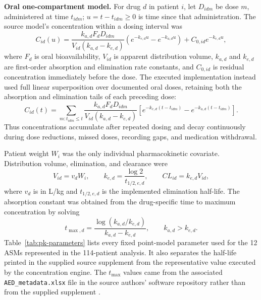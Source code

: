 \documentclass[11pt]{article}
\begin{document}
\textbf{Oral one-compartment model.} For drug $d$ in patient $i$, let $D_{idm}$ be dose $m$, administered at time $t_{idm}$; $u=t-t_{idm}\geq0$ is time since that administration. The source model's concentration within a dosing interval was
\begin{equation}
C_{id}(u)=
\frac{k_{a,d}F_dD_{idm}}{V_{id}(k_{a,d}-k_{e,d})}
\left(e^{-k_{e,d}u}-e^{-k_{a,d}u}\right)
+C_{0,id}e^{-k_{e,d}u},
\label{eq:pk-interval}
\end{equation}
where $F_d$ is oral bioavailability, $V_{id}$ is apparent distribution volume, $k_{a,d}$ and $k_{e,d}$ are first-order absorption and elimination rate constants, and $C_{0,id}$ is residual concentration immediately before the dose. The executed implementation instead used full linear superposition over documented oral doses, retaining both the absorption and elimination tails of each preceding dose:
\begin{equation}
C_{id}(t)=\sum_{m:t_{idm}\leq t}
\frac{k_{a,d}F_dD_{idm}}{V_{id}(k_{a,d}-k_{e,d})}
\left[e^{-k_{e,d}(t-t_{idm})}-e^{-k_{a,d}(t-t_{idm})}\right].
\label{eq:pk-superposition}
\end{equation}
Thus concentrations accumulate after repeated dosing and decay continuously during dose reductions, missed doses, recording gaps, and medication withdrawal.

Patient weight $W_i$ was the only individual pharmacokinetic covariate. Distribution volume, elimination, and clearance were
\begin{equation}
V_{id}=v_dW_i,\qquad
k_{e,d}=\frac{\log 2}{t_{1/2,e,d}},\qquad
CL_{id}=k_{e,d}V_{id},
\label{eq:pk-rates}
\end{equation}
where $v_d$ is in L/kg and $t_{1/2,e,d}$ is the implemented elimination half-life. The absorption constant was obtained from the drug-specific time to maximum concentration by solving
\begin{equation}
t_{\max,d}=\frac{\log(k_{a,d}/k_{e,d})}{k_{a,d}-k_{e,d}},\qquad k_{a,d}>k_{e,d}.
\label{eq:pk-tmax}
\end{equation}
Table~\ref{tab:pk-parameters} lists every fixed point-model parameter used for the 12 ASMs represented in the 114-patient analysis. It also separates the half-life printed in the supplied source supplement from the representative value executed by the concentration engine. The $t_{\max}$ values came from the associated
\texttt{AED\_metadata.xlsx} file in the source authors' software repository rather than from the supplied supplement \cite{GhosnSoftware}.
\end{document}
